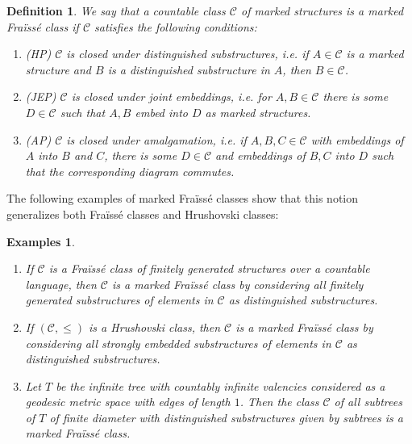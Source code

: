 \documentclass{amsart}
\newcommand{\C}{\mathcal{C}}
\newtheorem{definition}[defi]{Definition}
\newtheorem{examples}[defi]{Examples}
\begin{document}
\begin{definition}\label{def:marked Fraisse class}
We say that a countable class $\mathcal{C}$ of marked structures is a marked Fra\"iss\'e class if $\mathcal{C}$ satisfies the following conditions:

\begin{enumerate}
\item (HP) $\mathcal{C}$ is closed under distinguished substructures, i.e. if $A\in\mathcal{C}$ is a marked structure and $B$ is a distinguished substructure in $A$, then $B\in\mathcal{C}$.
\item (JEP) $\mathcal{C}$ is closed under joint embeddings, i.e. for $A, B\in\mathcal{C}$ there is some $D\in\mathcal{C}$ such that $A, B$ embed into $D$ as marked structures.
\item (AP) $\mathcal{C}$ is closed under amalgamation, i.e. if $A, B,C\in\mathcal{C}$ with embeddings of $A$ into $B$ and $C$, there is some $D\in\mathcal{C}$ and embeddings of $B, C$ into $D$ such that the corresponding diagram commutes.

\end{enumerate}


\end{definition}



The following  examples of marked Fra\"iss\'e classes show that this notion generalizes both Fra\"iss\'e classes and Hrushovski classes:
\begin{examples}\label{examples marked}

\begin{enumerate}
\item If $\mathcal{C}$ is a Fra\"iss\'e class of finitely generated structures over a countable language, then $\C$ is a marked Fra\"iss\'e class by considering all finitely generated substructures of elements in $\C$ as distinguished substructures.

\item If $(\C,\leq)$ is a Hrushovski class, then $\C$ is a marked Fra\"iss\'e class by considering all strongly embedded substructures of elements in $\C$ as distinguished substructures.

\item Let $T$ be the infinite tree with countably infinite valencies considered as a geodesic metric space with edges of length $1$. Then the class $\C$ of all subtrees of $T$ of finite diameter with distinguished substructures given by subtrees  is a marked Fra\"iss\'e class.
\end{enumerate}



\end{examples}
\end{document}
